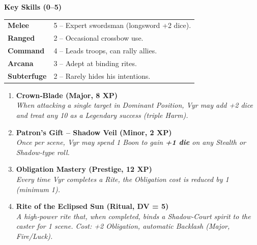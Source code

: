\documentclass[12pt,a4paper]{article}
\begin{document}
\vspace{6pt}
\noindent\textbf{Key Skills (0--5)}\\[2pt]
\begin{tabular}{>{\bfseries}l>{\raggedright}p{6cm}}
Melee       & 5 -- Expert swordsman (longsword +2 dice).\\
Ranged      & 2 -- Occasional crossbow use.\\
Command     & 4 -- Leads troops, can rally allies.\\
Arcana      & 3 -- Adept at binding rites.\\
Subterfuge  & 2 -- Rarely hides his intentions.\\
\end{tabular}

\begin{enumerate}[label=\Alph*. , leftmargin=*]
    \item \textbf{Crown‑Blade (Major, 8 XP)} \\
          \textit{When attacking a single target in Dominant Position, Vyr may
          add +2 dice and treat any 10 as a \emph{Legendary} success
          (triple Harm).}
    \item \textbf{Patron's Gift -- Shadow Veil (Minor, 2 XP)} \\
          \textit{Once per scene, Vyr may spend 1 Boon to gain \textbf{+1 die}
          on any Stealth or Shadow‑type roll.}
    \item \textbf{Obligation Mastery (Prestige, 12 XP)} \\
          \textit{Every time Vyr completes a Rite, the Obligation cost is
          reduced by 1 (minimum 1).}
    \item \textbf{Rite of the Eclipsed Sun (Ritual, DV = 5)} \\
          \textit{A high‑power rite that, when completed, binds a
          Shadow‑Court spirit to the caster for 1 scene.  Cost: +2 Obligation,
          automatic \emph{Backlash} (Major, Fire/Luck).}
\end{enumerate}
\end{document}
